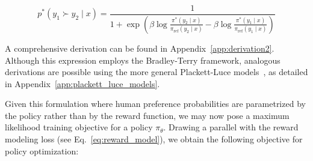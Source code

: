 \begin{equation}\label{eq:objective}
    p^*(y_1\succ y_2 \mid x)=\frac{1}{1 + \exp\left(\beta \log \frac{\pi^*(y_2\mid x)}{\pi_\text{ref}(y_2\mid x)} - \beta \log \frac{\pi^*(y_1\mid x)}{\pi_\text{ref}(y_1\mid x)}\right)}
\end{equation}

A comprehensive derivation can be found in Appendix~\ref{app:derivation2}. Although this expression employs the Bradley-Terry framework, analogous derivations are possible using the more general Plackett-Luce models~\citep{plackett1975analysis, luce2012individual}, as detailed in Appendix~\ref{app:plackett_luce_models}.

Given this formulation where human preference probabilities are parametrized by the policy rather than by the reward function, we may now pose a maximum likelihood training objective for a policy $\pi_\theta$. Drawing a parallel with the reward modeling loss (see Eq.~\ref{eq:reward_model}), we obtain the following objective for policy optimization:

